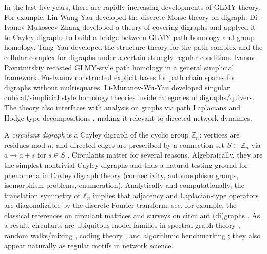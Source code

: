\documentclass[11pt]{amsart}
\newcommand{\Z}{\mathbb Z}
\theoremstyle{plain}
\theoremstyle{definition}
\numberwithin{equation}{section}
\begin{document}
  

In the last five years, there are rapidly increasing developments of GLMY theory. For example, Lin-Wang-Yau \cite{LWY} developed the discrete Morse theory on digraph. Di-Ivanov-Mukoseev-Zhang \cite{DIMZ} developed a theory of covering digraphs and applyed it to Cayley digraphs to build a bridge between GLMY path homology and group homology. Tang-Yau developed the structure theory \cite{TY1} for the path complex and the cellular complex \cite{TY2} for digraphs under a certain strongly regular condition. Ivanov-Pavutnitskiy \cite{IP} recasted GLMY-style path homology in a general simplicial framework. Fu-Ivanov \cite{FI} constructed explicit bases for path chain spaces for digraphs without multisquares. Li-Muranov-Wu-Yau \cite{LMWY} developed singular cubical/simplicial style homology theories inside categories of digraphs/quivers. The theory also interfaces with analysis on graphs via path Laplacians and Hodge-type decompositions \cite{GrigoryanHodge, GLYZ:eigenvalues}, making it relevant to directed network dynamics. 

\vskip 0.3cm

A \emph{circulant digraph} is a Cayley digraph of the cyclic group $\mathbb{Z}_n$: vertices are residues mod $n$, and directed edges are prescribed by a connection set $S\subset \mathbb{Z}_n$ via $a\to a+s$ for $s\in S$ \cite{CayleyMathWorld,Alspach2002,CirculantThesis2016}. 
Circulants matter for several reasons.
Algebraically, they are the simplest nontrivial Cayley digraphs and thus a natural testing ground for phenomena in Cayley
digraph theory (connectivity, automorphism groups, isomorphism problems, enumeration).
Analytically and computationally, the translation symmetry of $\Z_n$ implies that adjacency and Laplacian-type operators
are diagonalizable by the discrete Fourier transform; see, for example, the classical references on circulant matrices
\cite{Davis1979,Gray2006} and surveys on circulant (di)graphs \cite{Morris06Survey}.
As a result, circulants are ubiquitous model families in spectral graph theory \cite{Biggs}, random walks/mixing \cite{ABTW}, coding theory \cite{Fossorier04, MBGcoding}, and algorithmic benchmarking \cite{BCH95, Hwang03, HRD2022}; they also appear naturally as regular motifs in network science.
\end{document}
